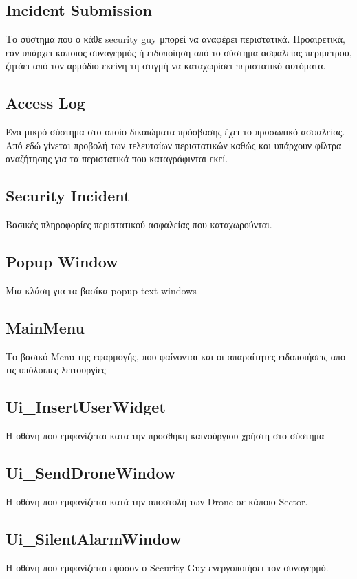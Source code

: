 \documentclass{article}
\begin{document}
\subsection{Incident Submission}
Το σύστημα που ο κάθε security guy μπορεί να αναφέρει περιστατικά. Προαιρετικά, εάν υπάρχει κάποιος συναγερμός ή ειδοποίηση από το σύστημα ασφαλείας περιμέτρου, ζητάει από τον αρμόδιο εκείνη τη στιγμή να καταχωρίσει περιστατικό αυτόματα.

\subsection{Access Log}
Ένα μικρό σύστημα στο οποίο δικαιώματα πρόσβασης έχει το προσωπικό ασφαλείας. Από εδώ γίνεται προβολή των τελευταίων περιστατικών καθώς και υπάρχουν φίλτρα αναζήτησης για τα περιστατικά που καταγράφινται εκεί.

\subsection{Security Incident}
Βασικές πληροφορίες περιστατικού ασφαλείας που καταχωρούνται.

\subsection{Popup Window}
Μια κλάση για τα βασίκα popup text windows

\subsection{MainMenu}
Το βασικό Menu της εφαρμογής, που φαίνονται και οι απαραίτητες ειδοποιήσεις απο τις υπόλοιπες λειτουργίες

\subsection{Ui\_InsertUserWidget}
Η οθόνη που εμφανίζεται κατα την προσθήκη καινούργιου χρήστη στο σύστημα

\subsection{Ui\_SendDroneWindow}
Η οθόνη που εμφανίζεται κατά την αποστολή των Drone σε κάποιο Sector.

\subsection{Ui\_SilentAlarmWindow}
Η οθόνη που εμφανίζεται εφόσον ο Security Guy ενεργοποιήσει τον συναγερμό.
\end{document}
